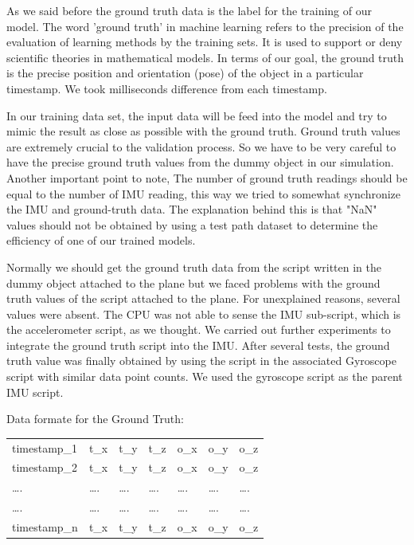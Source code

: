 As we said before the ground truth data is the label for the training of our model. The word 'ground truth' in machine learning refers to the precision of the evaluation of learning methods by the training sets. It is used to support or deny scientific theories in mathematical models.  In terms of our goal, the ground truth is the precise position and orientation (pose) of the object in a particular timestamp. We took milliseconds difference from each timestamp.

In our training data set, the input data will be feed into the model and try to mimic the result as close as possible with the ground truth. Ground truth values are extremely crucial to the validation process. So we have to be very careful to have the precise ground truth values from the dummy object in our simulation.
Another important point to note, The number of ground truth readings should be equal to the number of IMU reading, this way we tried to somewhat synchronize the IMU and ground-truth data. The explanation behind this is that "NaN" values should not be obtained by using a test path dataset to determine the efficiency of one of our trained models.

Normally we should get the ground truth data from the script written in the dummy object attached to the plane but we faced problems with the ground truth values of the script attached to the plane. 
For unexplained reasons, several values were absent. The CPU was not able to sense the IMU sub-script, which is the accelerometer script, as we thought. 
We carried out further experiments to integrate the ground truth script into the IMU. After several tests, the ground truth value was finally obtained by using the script in the associated Gyroscope script with similar data point counts. We used the gyroscope script as the parent IMU script.

Data formate for the Ground Truth:

\begin{table}[h]
\begin{tabular}{lllllll}
 timestamp\_1 &  t\_x &   t\_y &   t\_z &   o\_x &   o\_y  &  o\_z \\
  timestamp\_2 &  t\_x &   t\_y &   t\_z &   o\_x &   o\_y  &  o\_z \\
…. & …. &  …. & …. & …. & …. & …. \\
…. & …. &  …. & …. & …. & …. & ….  \\
 timestamp\_n &  t\_x &   t\_y &   t\_z &   o\_x &   o\_y  &  o\_z
\end{tabular}
\end{table}


